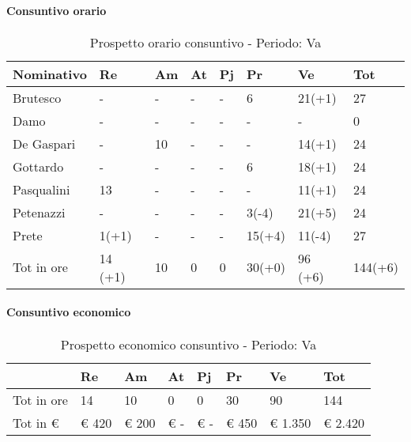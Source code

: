 				\paragraph{Consuntivo orario}
				\begin{table}[H] \begin{center} \begin{tabular}{llllllll}
							\toprule
							\textbf{Nominativo}	&	\textbf{Re}	&	\textbf{Am}	&	\textbf{At}	&	\textbf{Pj}	&	\textbf{Pr}	&	\textbf{Ve}	&	\textbf{Tot}	 \\
							\midrule
							Brutesco	&	-		&	-		&	-		&	-		&	6		&	21(+1)		&	27	\\
							Damo		&	-		&	-		&	-		&	-		&	-		&	-		&	0	\\
							De Gaspari	&	-		&	10		&	-		&	-		&	-		&	14(+1)		&	24	\\
							Gottardo	&	-		&	-		&	-		&	-		&	6		&	18(+1)		&	24	\\
							Pasqualini	&	13		&	-		&	-		&	-		&	-		&	11(+1)		&	24	\\
							Petenazzi	&	-		&	-		&	-		&	-		&	3(-4)	&	21(+5)	&	24	\\
							Prete		&	1(+1)	&	-		&	-		&	-		&	15(+4)	&	11(-4)	&	27	\\
							\midrule																					
							Tot in ore	&	14	(+1)&	10		&	0		&	0		&	30(+0)	&	96	(+6)&	144(+6)	\\
							
							\bottomrule
						\end{tabular} \end{center} \caption{Prospetto orario consuntivo - Periodo:
						Va
					}\end{table}
					\paragraph{Consuntivo economico}
					\begin{table}[H] \begin{center} \begin{tabular}{llllllll}
								\toprule
								&	\textbf{Re}	&	\textbf{Am}	&	\textbf{At}	&	\textbf{Pj}	&	\textbf{Pr}	&	\textbf{Ve}	&	\textbf{Tot}	 \\
								
								\midrule
								Tot in ore	&	14		&	10		&	0		&	0		&	30		&	90		&	144	\\
								Tot in €	&	 € 420 		 & 	 € 200 		 & 	 € -   		 & 	 € -   		 & 	 € 450 		 & 	 € 1.350 		 & 	 € 2.420 	\\
								\bottomrule
							\end{tabular} \end{center} \caption{Prospetto economico consuntivo - Periodo:
							Va
						}\end{table}
						
